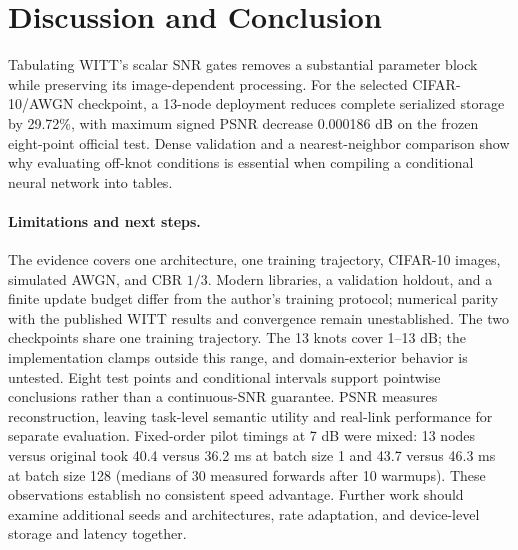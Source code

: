 \section{Discussion and Conclusion}
Tabulating WITT's scalar SNR gates removes a substantial parameter block while preserving its image-dependent processing. For the selected CIFAR-10/AWGN checkpoint, a 13-node deployment reduces complete serialized storage by 29.72\%, with maximum signed PSNR decrease 0.000186 dB on the frozen eight-point official test. Dense validation and a nearest-neighbor comparison show why evaluating off-knot conditions is essential when compiling a conditional neural network into tables.

\paragraph{Limitations and next steps.}
The evidence covers one architecture, one training trajectory, CIFAR-10 images, simulated AWGN, and CBR $1/3$. Modern libraries, a validation holdout, and a finite update budget differ from the author's training protocol; numerical parity with the published WITT results and convergence remain unestablished. The two checkpoints share one training trajectory. The 13 knots cover 1--13 dB; the implementation clamps outside this range, and domain-exterior behavior is untested. Eight test points and conditional intervals support pointwise conclusions rather than a continuous-SNR guarantee. PSNR measures reconstruction, leaving task-level semantic utility and real-link performance for separate evaluation. Fixed-order pilot timings at 7 dB were mixed: 13 nodes versus original took 40.4 versus 36.2 ms at batch size 1 and 43.7 versus 46.3 ms at batch size 128 (medians of 30 measured forwards after 10 warmups). These observations establish no consistent speed advantage. Further work should examine additional seeds and architectures, rate adaptation, and device-level storage and latency together.
